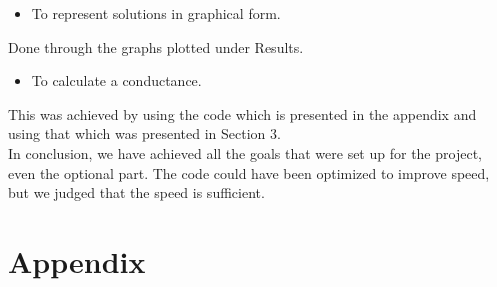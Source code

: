 \documentclass[a4paper]{article}
\begin{document}
\begin{itemize}
\item To represent solutions in graphical form.
\end{itemize}
Done through the graphs plotted under Results.
\begin{itemize}
\item To calculate a conductance.
\end{itemize}
This was achieved by using the code which is presented in the appendix and using that which was presented in Section 3.
\\
In conclusion, we have achieved all the goals that were set up for the project, even the optional part.  The code could have been optimized to improve speed, but we judged that the speed is sufficient.

\newpage



\newpage
\part*{Appendix}


\end{document}
